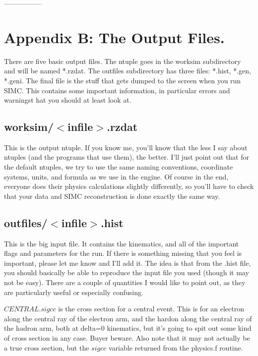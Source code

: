 -----------------
\section{Appendix B: The Output Files.}

There are five basic output files.  The ntuple goes in the worksim subdirectory
and will be named *.rzdat.  The outfiles subdirectory has three
files: *.hist, *.gen, *.geni.  The final file is the stuff that gets dumped
to the screen when you run SIMC.  This contains some important information,
in particular errors and warningst hat you should at least look at.

\subsection{worksim/$<$infile$>$.rzdat}

This is the output ntuple.  If you know me, you'll know that the less I say
about ntuples (and the programs that use them), the better.  I'll just point
out that for the default ntuples, we try to use the same naming conventions,
coordinate systems, units, and formula as we use in the engine.  Of course in
the end, everyone does their physics calculations slightly differently, so
you'll have to check that your data and SIMC reconstruction is done exactly the
same way.

\subsection{outfiles/$<$infile$>$.hist}

This is the big input file.  It contains the kinematics, and all of the
important flags and parameters for the run.  If there is something missing that
you feel is important, please let me know and I'll add it.  The idea is that
from the .hist file, you should basically be able to reproduce the input file
you used (though it may not be easy).  There are a couple of quantities I 
would like to point out, as they are particularly useful or especially confusing.

$CENTRAL.sigcc$ is the cross section for a central event.  This is for an
electron along the central ray of the electron arm, and the hardon along the
central ray of the hadron arm, both at delta=0%
kinematics, but it's going to spit out some kind of cross section in any case. 
Buyer beware. Also note that it may not actually be a true cross section, but
the $sigcc$ variable returned from the physics.f routine.

